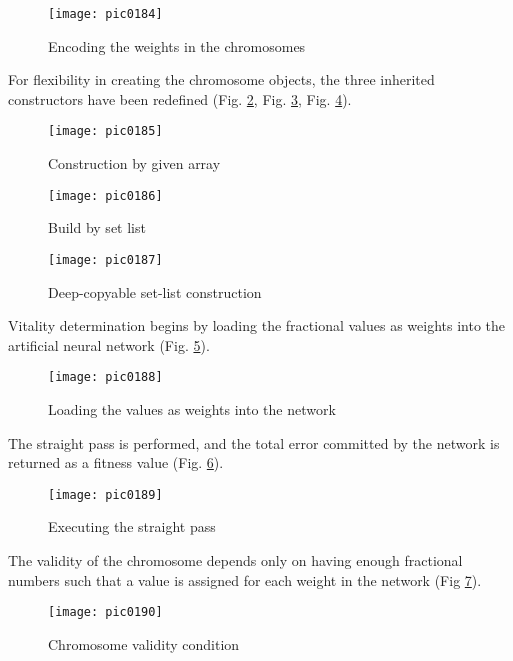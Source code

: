 \begin{figure}[h]
\centering
\texttt{[image: pic0184]}
\caption{Encoding the weights in the chromosomes}
\label{fig:pic0184}
\end{figure}
\FloatBarrier

For flexibility in creating the chromosome objects, the three inherited constructors have been redefined (Fig. \ref{fig:pic0185}, Fig. \ref{fig:pic0186}, Fig. \ref{fig:pic0187}).

\begin{figure}[h]
\centering
\texttt{[image: pic0185]}
\caption{Construction by given array}
\label{fig:pic0185}
\end{figure}
\FloatBarrier

\begin{figure}[h]
\centering
\texttt{[image: pic0186]}
\caption{Build by set list}
\label{fig:pic0186}
\end{figure}
\FloatBarrier

\begin{figure}[h]
\centering
\texttt{[image: pic0187]}
\caption{Deep-copyable set-list construction}
\label{fig:pic0187}
\end{figure}
\FloatBarrier

Vitality determination begins by loading the fractional values as weights into the artificial neural network (Fig. \ref{fig:pic0188}).

\begin{figure}[h]
\centering
\texttt{[image: pic0188]}
\caption{Loading the values as weights into the network}
\label{fig:pic0188}
\end{figure}
\FloatBarrier

The straight pass is performed, and the total error committed by the network is returned as a fitness value (Fig. \ref{fig:pic0189}).

\begin{figure}[h]
\centering
\texttt{[image: pic0189]}
\caption{Executing the straight pass}
\label{fig:pic0189}
\end{figure}
\FloatBarrier

The validity of the chromosome depends only on having enough fractional numbers such that a value is assigned for each weight in the network (Fig \ref{fig:pic0190}).

\begin{figure}[h]
\centering
\texttt{[image: pic0190]}
\caption{Chromosome validity condition}
\label{fig:pic0190}
\end{figure}
\FloatBarrier

